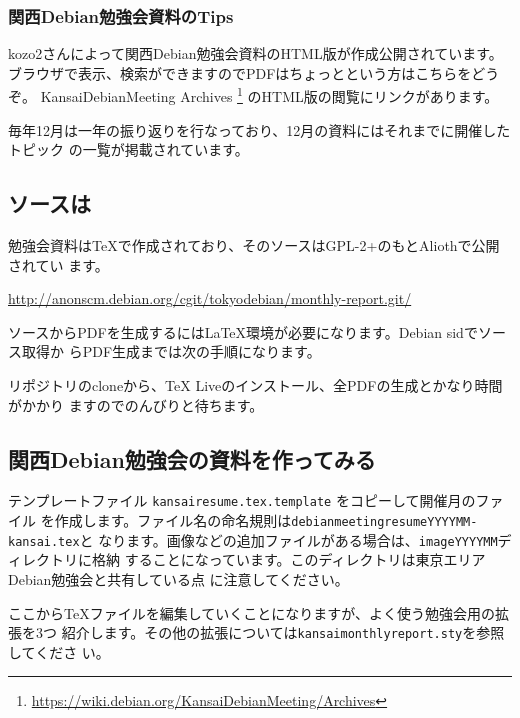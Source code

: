 \documentclass[mingoth,a4paper]{jsarticle}
\begin{document}
\subsubsection{関西Debian勉強会資料のTips}

kozo2さんによって関西Debian勉強会資料のHTML版が作成公開されています。
ブラウザで表示、検索ができますのでPDFはちょっとという方はこちらをどうぞ。
KansaiDebianMeeting Archives
\footnote{\url{https://wiki.debian.org/KansaiDebianMeeting/Archives}}
のHTML版の閲覧にリンクがあります。

毎年12月は一年の振り返りを行なっており、12月の資料にはそれまでに開催したトピック
の一覧が掲載されています。

\subsection{ソースは}

勉強会資料は\TeX{}で作成されており、そのソースはGPL-2+のもとAliothで公開されてい
ます。

\url{http://anonscm.debian.org/cgit/tokyodebian/monthly-report.git/}

ソースからPDFを生成するには\LaTeX{}環境が必要になります。Debian sidでソース取得か
らPDF生成までは次の手順になります。


リポジトリのcloneから、\TeX{} Liveのインストール、全PDFの生成とかなり時間がかかり
ますのでのんびりと待ちます。

\subsection{関西Debian勉強会の資料を作ってみる}

テンプレートファイル {\tt kansairesume.tex.template} をコピーして開催月のファイル
を作成します。ファイル名の命名規則は{\tt debianmeetingresumeYYYYMM-kansai.tex}と
なります。画像などの追加ファイルがある場合は、{\tt imageYYYYMM}ディレクトリに格納
することになっています。このディレクトリは東京エリアDebian勉強会と共有している点
に注意してください。

ここから\TeX{}ファイルを編集していくことになりますが、よく使う勉強会用の拡張を3つ
紹介します。その他の拡張については{\tt kansaimonthlyreport.sty}を参照してくださ
い。
\end{document}
